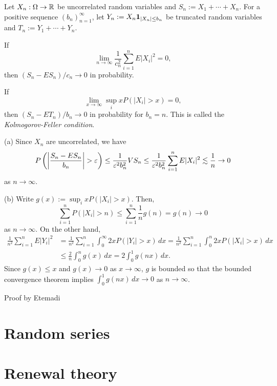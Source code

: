 \documentclass{../note}
\begin{document}
\begin{prb}
Let $X_n:\Omega\to\mathbb{R}$ be uncorrelated random variables and $S_n:=X_1+\cdots+X_n$.
For a positive sequence $(b_n)_{n=1}^\infty$, let $Y_n:=X_n\mathbf{1}_{|X_n|\le b_n}$ be truncated random variables and $T_n:=Y_1+\cdots+Y_n$.
\begin{parts}
\item If
\[\lim_{n\to\infty}\frac1{c_n^2}\sum_{i=1}^nE|X_i|^2=0,\]
then $(S_n-ES_n)/c_n\to0$ in probability.
\item If
\[\lim_{x\to\infty}\sup_ixP(|X_i|>x)=0,\]
then $(S_n-ET_n)/b_n\to0$ in probability for $b_n=n$.
This is called the \emph{Kolmogorov-Feller condition}.
\end{parts}
\end{prb}
\begin{pf}
(a)
Since $X_n$ are uncorrelated, we have
\[P\left(\left|\frac{S_n-ES_n}{b_n}\right|>\e\right)\le\frac1{\e^2b_n^2}VS_n\le\frac1{\e^2b_n^2}\sum_{i=1}^nE|X_i|^2\lesssim\frac1n\to0\]
as $n\to\infty$.

(b)
Write $g(x):=\sup_ixP(|X_i|>x)$.
Then,
\[\sum_{i=1}^nP(|X_i|>n)\le\sum_{i=1}^n\frac1ng(n)=g(n)\to0\]
as $n\to\infty$.
On the other hand,
\begin{align*}
\frac1{n^2}\sum_{i=1}^nE|Y_i|^2
&=\frac1{n^2}\sum_{i=1}^n\int_0^\infty2xP(|Y_i|>x)\,dx
=\frac1{n^2}\sum_{i=1}^n\int_0^n2xP(|X_i|>x)\,dx\\
&\le\frac2n\int_0^ng(x)\,dx
=2\int_0^1g(nx)\,dx.
\end{align*}
Since $g(x)\le x$ and $g(x)\to0$ as $x\to\infty$, $g$ is bounded so that the bounded convergence theorem implies $\int_0^1g(nx)\,dx\to0$ as $n\to\infty$.
\end{pf}



\begin{prb}
\end{prb}

\begin{prb}
Proof by Etemadi
\end{prb}

\section{Random series}

\section{Renewal theory}
\end{document}
